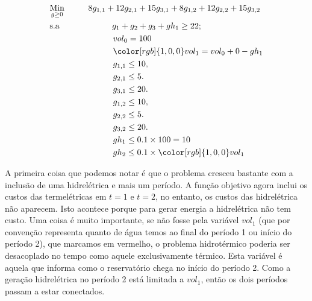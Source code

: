 \begin{align}
    & \underset{g\geq0}{\text{Min}} \hspace{1cm} 8g_{1,1}+12g_{2,1}+15g_{3,1}+8g_{1,2}+12g_{2,2}+15g_{3,2}  \\
    & \text{s.a}  \hspace{2.2cm} g_1+g_2+g_3+gh_1 \geq 22;  \\
    &             \hspace{2.65cm} vol_0=100\\
    &             \hspace{2.65cm} {\color[rgb]{1,0,0}vol_1}= vol_0+0-gh_1\\
    &             \hspace{2.65cm} g_{1,1}\leq 10, \\
    &             \hspace{2.65cm} g_{2,1}\leq 5. \\
    &             \hspace{2.65cm} g_{3,1}\leq 20. \\
    &             \hspace{2.65cm} g_{1,2}\leq 10, \\
    &             \hspace{2.65cm} g_{2,2}\leq 5. \\
    &             \hspace{2.65cm} g_{3,2}\leq 20. \\
    &             \hspace{2.65cm} gh_1\leq 0.1\times100=10\\
    &             \hspace{2.65cm} gh_2\leq 0.1\times {\color[rgb]{1,0,0}vol_1}
\end{align}


A primeira coisa que podemos notar é que o problema cresceu bastante com a inclusão de uma hidrelétrica e mais um período. A função objetivo agora inclui os custos das termelétricas em $t=1$ e $t=2$, no entanto, os custos das hidrelétrica não aparecem. Isto acontece porque para gerar energia a hidrelétrica não tem custo. Uma coisa é muito importante, se não fosse pela variável $vol_1$ (que por convenção representa quanto de água temos ao final do período 1 ou início do período 2), que marcamos em vermelho, o problema hidrotérmico poderia ser desacoplado no tempo como aquele exclusivamente térmico. Esta variável é aquela que informa como o reservatório chega no início do período 2. Como a geração hidrelétrica no período 2 está limitada a $vol_1$, então os dois períodos passam a estar conectados. 

